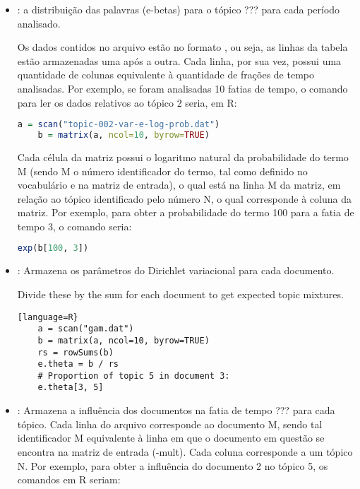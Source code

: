 \begin{itemize}
	\item {}: a distribuição das
	palavras (e-betas) para o tópico ??? para cada período analisado.

	Os dados contidos no arquivo estão no formato ,
	ou seja, as linhas da tabela estão armazenadas uma após a outra.
	Cada linha, por sua vez, possui uma quantidade de colunas equivalente
	à quantidade de frações de tempo analisadas. Por exemplo, se foram
	analisadas 10 fatias de tempo, o comando para ler os dados relativos
	ao tópico 2 seria, em R:

	\begin{lstlisting}[language=R]
	a = scan("topic-002-var-e-log-prob.dat")
	b = matrix(a, ncol=10, byrow=TRUE)
	\end{lstlisting}

	Cada célula da matriz possui o logaritmo natural da probabilidade do
	termo M (sendo M o número identificador do termo, tal como definido
	no vocabulário e na matriz de entrada), o qual está na linha M da
	matriz, em relação ao tópico identificado pelo número N, o qual
	corresponde à coluna da matriz. Por exemplo, para obter a
	probabilidade do termo 100 para a fatia de tempo 3, o comando seria:

	\begin{lstlisting}[language=R]
	exp(b[100, 3])
	\end{lstlisting}


	\item {}: Armazena os parâmetros do Dirichlet variacional
	para cada documento. 


	Divide these by the sum for each document to get expected topic mixtures.
	\begin{lstlisting}[language=R}
	a = scan("gam.dat")
	b = matrix(a, ncol=10, byrow=TRUE)
	rs = rowSums(b)
	e.theta = b / rs
	# Proportion of topic 5 in document 3:
	e.theta[3, 5]
	\end{lstlisting}


	\item[\srccode{influence_time-???}]: Armazena a influência dos documentos na
	fatia de tempo ??? para cada tópico. Cada linha do arquivo corresponde ao
	documento M, sendo tal identificador M equivalente à linha em que o documento
	em questão se encontra na matriz de entrada (-mult). Cada coluna corresponde
	a um tópico N. Por exemplo, para obter a influência do documento 2 no tópico
	5, os comandos em R seriam:


\end{itemize}
